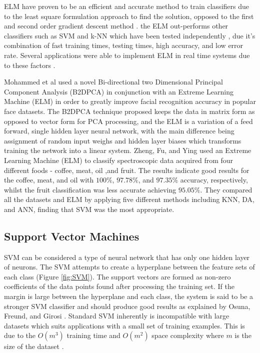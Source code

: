 \documentclass[fleqn,twoside,12pt]{report}
\begin{document}
ELM have proven to be an efficient and accurate method to train classifiers due to the least square formulation approach to find the solution, opposed to the first and second order gradient descent method \cite{yavs}. the ELM out-performs other classifiers such as SVM and k-NN which have been tested independently \cite{yavs, wan, peng}, due it's combination of fast training times, testing times, high accuracy, and low error rate. Several applications were able to implement ELM in real time systems due to these factors \cite{xu, yavs}.  

Mohammed et al \cite{mohammed} used a novel Bi-directional two Dimensional Principal Component Analysis (B2DPCA) in conjunction with an Extreme Learning Machine (ELM) in order to greatly improve facial recognition accuracy in popular face datasets. The B2DPCA technique proposed keeps the data in matrix form as opposed to vector form for PCA processing, and the ELM is a variation of a feed forward, single hidden layer neural network, with the main difference being assignment of random input weighs and hidden layer biases which transforms training the network into a linear system. Zheng, Fu, and Ying \cite{zheng} used an Extreme Learning Machine (ELM) to classify spectroscopic data acquired from four different foods - coffee, meat, oil ,and fruit. The results indicate good results for the coffee, meat, and oil with $100\%$, $97.78\%$, and $97.35\%$ accuracy, respectively, whilst the fruit classification was less accurate achieving $95.05\%$. They compared all the datasets and ELM by applying five different methods including KNN, DA, and ANN, finding that SVM was the most appropriate. 


\subsection{Support Vector Machines}


SVM can be considered a type of neural network that has only one hidden layer of neurons. The SVM attempts to create a hyperplane between the feature sets of each class (Figure \ref{fig:SVM}). The support vectors are formed as non-zero coefficients of the data points found after processing the training set. If the margin is large between the hyperplane and each class, the system is said to be a stronger SVM classifier and should produce good results as explained by Osuna, Freund, and Girosi \cite{osuna}. Standard SVM inherently is incompatible with large datasets which suits applications with a small set of training examples. This is due to the $O(m^3)$ training time and $O(m^2)$ space complexity where $m$ is the size of the dataset \cite{tsang}.
\end{document}
